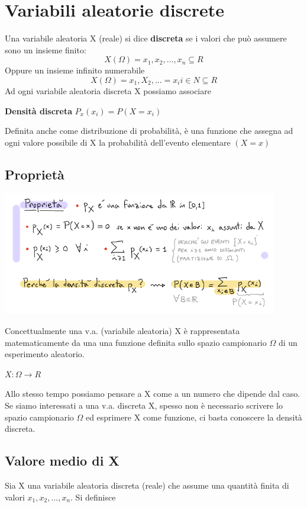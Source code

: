 \documentclass[12pt, a4paper, openany]{book}
\begin{document}
\section{Variabili aleatorie discrete}
Una variabile aleatoria X (reale) si dice \textbf{discreta} se i valori che può
assumere sono un insieme finito:
\begin{equation}
    X(\Omega) = {x_1, x_2, \dots, x_n} \subseteq  R
\end{equation}
Oppure un insieme infinito numerabile
\begin{equation}
    X(\Omega) = {x_1, X_2, \dots } = {x_i} i \in N \subseteq R
\end{equation}
Ad ogni variabile aleatoria discreta X possiamo associare
\begin{center}
    \textbf{Densità discreta} $P_x(x_i) = P(X = x_i)$
\end{center}
Definita anche come distribuzione di probabilità, è una funzione che assegna
ad ogni valore possibile di X la probabilità dell'evento elementare $(X = x)$
\subsection{Proprietà}
\begin{center}
    \includegraphics[width=120mm, scale=0.5]{prop_densità_discreta.png}
\end{center}
Concettualmente una v.a. (variabile aleatoria) X è rappresentata matematicamente da una
una funzione definita sullo spazio campionario $\Omega$ di un esperimento aleatorio.
\begin{center}
    $X:\Omega \to R$
\end{center}
Allo stesso tempo possiamo pensare a X come a un numero che dipende dal caso.
Se siamo interessati a una v.a. discreta X, spesso non è necessario scrivere lo
spazio campionario $\Omega$ ed esprimere X come funzione, 
ci basta conoscere la densità discreta.

\subsection{Valore medio di X}
Sia X una variabile aleatoria discreta (reale) che assume una quantità finita di valori
$x_1, x_2, \dots, x_n$. Si definisce
\end{document}
